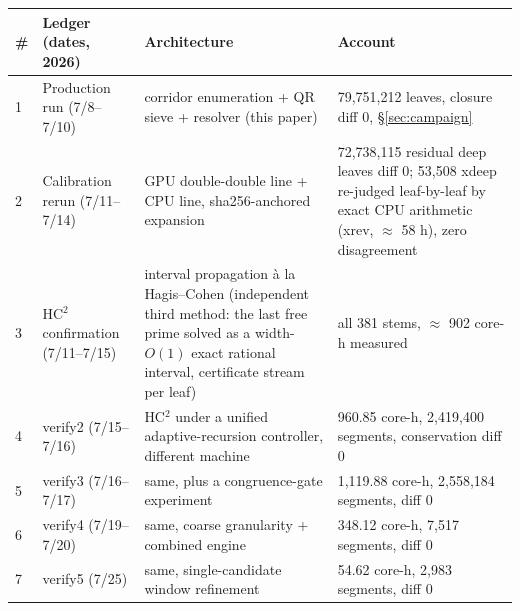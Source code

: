 \documentclass[11pt]{article}
\theoremstyle{remark}
\begin{document}
\begin{center}\footnotesize
\begin{tabular}{p{0.4cm}p{2.9cm}p{4.6cm}p{5.2cm}}
\toprule \# & Ledger (dates, 2026) & Architecture & Account \\
\midrule 1 & Production run (7/8--7/10) & corridor enumeration + QR sieve + resolver (this paper) & 79,751,212 leaves, closure diff 0, \S\ref{sec:campaign} \\
2 & Calibration rerun (7/11--7/14) & GPU double-double line + CPU line, sha256-anchored expansion & 72,738,115 residual deep leaves diff 0; 53,508 xdeep re-judged leaf-by-leaf by exact CPU arithmetic (xrev, $\approx$ 58 h), zero disagreement \\
3 & HC$^2$ confirmation (7/11--7/15) & interval propagation \`a la Hagis--Cohen (independent third method: the last free prime solved as a width-$O(1)$ exact rational interval, certificate stream per leaf) & all 381 stems, $\approx$ 902 core-h measured \\
4 & verify2 (7/15--7/16) & HC$^2$ under a unified adaptive-recursion controller, different machine & 960.85 core-h, 2,419,400 segments, conservation diff 0 \\
5 & verify3 (7/16--7/17) & same, plus a congruence-gate experiment & 1,119.88 core-h, 2,558,184 segments, diff 0 \\
6 & verify4 (7/19--7/20) & same, coarse granularity + combined engine & 348.12 core-h, 7,517 segments, diff 0 \\
7 & verify5 (7/25) & same, single-candidate window refinement & 54.62 core-h, 2,983 segments, diff 0 \\
\bottomrule
\end{tabular}
\end{center}
\end{document}
